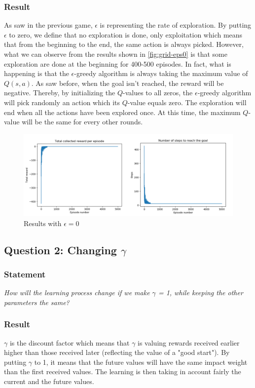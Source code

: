 \documentclass{article}
\begin{document}
\subsubsection{Result}
As saw in the previous game, $\epsilon$ is representing the rate of exploration. By putting $\epsilon$ to zero, we define that no exploration is done, only exploitation which means that from the beginning to the end, the same action is always picked. However, what we can observe from the results shown in \autoref{fig:grid-eps0} is that some exploration are done at the beginning for 400-500 episodes. In fact, what is happening is that the $\epsilon$-greedy algorithm is always taking the maximum value of $Q(s,a)$. As saw before, when the goal isn't reached, the reward will be negative. Thereby, by initializing the $Q$-values to all zeros, the $\epsilon$-greedy algorithm will pick randomly an action which its $Q$-value equals zero. The exploration will end when all the actions have been explored once. At this time, the maximum $Q$-value will be the same for every other rounds.  

\begin{figure}[H]
  \centering
  \includegraphics[scale=0.25]{fig/grid-eps0.png}
  \caption{Results with $\epsilon = 0$}
  \label{fig:grid-eps0}
\end{figure}

\subsection{Question 2: Changing $\gamma$}

\subsubsection*{Statement}
\textit{How will the learning process change if we make $\gamma$ = 1, while keeping the other parameters the same?} 

\subsubsection{Result}
$\gamma$ is the discount factor which means that $\gamma$ is valuing rewards received earlier higher than those received later (reflecting the value of a "good start"). By putting $\gamma$ to 1, it means that the future values will have the same impact weight than the first received values. The learning is then taking in account fairly the current and the future values. 
\end{document}
